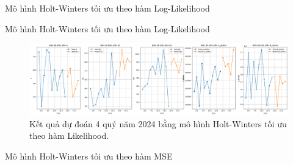 \begin{frame}{Mô hình Holt-Winters tối ưu theo hàm Log-Likelihood}
    \begin{table}[H]
    \centering
    \caption{Kết quả dự báo 4 quý năm 2024 bằng mô hình Holt-Winters tối ưu theo hàm Log-Likelihood.}
    \label{HL4nam2024}
\end{table}
\end{frame}

\begin{frame}{Mô hình Holt-Winters tối ưu theo hàm Log-Likelihood}
    \begin{figure}[H]
    \centering
    \includegraphics[width = \textwidth]{figure/HW-likelihood.png}
     \caption{Kết quả dự đoán 4 quý năm 2024 bằng mô hình Holt-Winters tối ưu theo hàm Likelihood.}
\end{figure}
\end{frame}

\begin{frame}{Mô hình Holt-Winters tối ưu theo hàm MSE}
    \begin{table}[H]
    \centering
    \caption{Kết quả dự báo 4 quý năm 2024 bằng mô hình Holt-Winters tối ưu theo hàm MSE.}
    \label{HM4nam2024}
\end{table} 
\end{frame}

